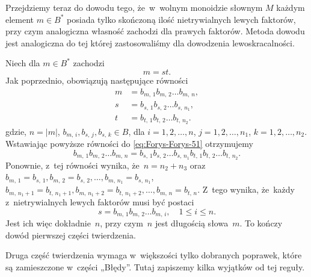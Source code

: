 \documentclass[a4paper,11pt]{article}
\begin{document}
Przejdziemy teraz do dowodu tego, że~w~wolnym monoidzie słownym $M$ każdym
element $m \in B^{ * }$ posiada tylko skończoną ilość nietrywialnych lewych
faktorów, przy czym analogiczna własność zachodzi dla prawych faktorów.
Metoda dowodu jest analogiczna do tej której zastosowaliśmy dla dowodzenia
lewoskracalności.

Niech dla $m \in B^{ * }$ zachodzi
\begin{equation}
  \label{eq:Forys-Forys-51}
  m = s t.
\end{equation}
Jak poprzednio, obowiązują następujące równości
\begin{subequations}
  \begin{align}
    \label{eq:Forys-Forys-52-A}
    m &= b_{ m,\, 1 } b_{ m,\, 2 } \ldots b_{ m,\, n }, \\
    \label{eq:Forys-Forys-52-B}
    s &= b_{ s,\, 1 } b_{ s,\, 2 } \ldots b_{ s,\, n_{ 1 } }, \\
    \label{eq:Forys-Forys-52-C}
    t &= b_{ t,\, 1 } b_{ t,\, 2 } \ldots b_{ t,\, n_{ 2 } }.
  \end{align}
\end{subequations}
gdzie, $n = | m |$, $b_{ m,\, i }, b_{ s,\, j }, b_{ s,\, k } \in B$,
dla $i = 1, 2, \ldots, n$, $j = 1, 2, \ldots, n_{ 1 }$, $k = 1, 2, \ldots, n_{ 2 }$.
Wstawiając powyższe równości do \eqref{eq:Forys-Forys-51} otrzymujemy
\begin{equation}
  \label{eq:Forys-Forys-53}
  b_{ m,\, 1 } b_{ m,\, 2 } \ldots b_{ m,\, n } =
  b_{ s,\, 1 } b_{ s,\, 2 } \ldots b_{ s,\, n_{ 1 } }
  b_{ t,\, 1 } b_{ t,\, 2 } \ldots b_{ t,\, n_{ 2 } }.
\end{equation}
Ponownie, z~tej równości wynika, że~$n = n_{ 2 } + n_{ 3 }$ oraz
$b_{ m,\, 1 } = b_{ s,\, 1 }, b_{ m,\, 2 } = b_{ s,\, 2 }, \ldots,
b_{ m,\, n_{ 1 } } = b_{ s,\, n_{ 1 } }$, $b_{ m,\, n_{ 1 } + 1 } = b_{ t,\, n_{ 1 } + 1 },
b_{ m,\, n_{ 1 } + 2 } = b_{ t,\, n_{ 1 } + 2 }, \ldots,
b_{ m,\, n } = b_{ t,\, n }$. Z~tego wynika, że~każdy z~nietrywialnych
lewych faktorów musi być postaci
\begin{equation}
  \label{eq:Forys-Forys-54}
  s = b_{ m,\, 1 } b_{ m,\, 2 } \ldots b_{ m,\, i }, \quad
  1 \leq i \leq n.
\end{equation}
Jest ich więc dokładnie~$n$, przy czym~$n$ jest długością słowa~$m$. To
kończy dowód pierwszej części twierdzenia.

Druga część twierdzenia wymaga w~większości tylko dobranych poprawek, które
są zamieszczone w~części „Błędy”. Tutaj zapiszemy kilka wyjątków od
tej reguły.
\end{document}
